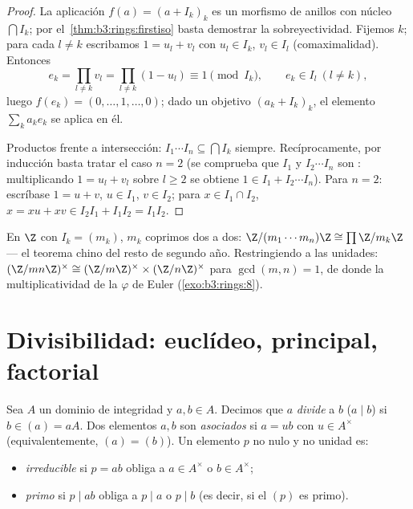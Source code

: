 \begin{proof}
La aplicación $f(a) = (a + I_k)_k$ es un morfismo de anillos con núcleo
$\bigcap I_k$; por el~\cref{thm:b3:rings:firstiso} basta demostrar la
sobreyectividad. Fijemos $k$; para cada $l \neq k$ escribamos $1 = u_l +
v_l$ con $u_l \in I_k$, $v_l \in I_l$ (comaximalidad). Entonces
\[
e_k = \prod_{l \neq k} v_l = \prod_{l\neq k}(1 - u_l)
\equiv 1 \pmod{I_k},
\qquad e_k \in I_l \ (l \neq k),
\]
luego $f(e_k) = (0, \dots, 1, \dots, 0)$; dado un objetivo $(a_k +
I_k)_k$, el elemento $\sum_k a_k e_k$ se aplica en él.

Productos frente a intersección: $I_1\cdots I_n \subseteq \bigcap I_k$
siempre. Recíprocamente, por inducción basta tratar el caso $n = 2$ (se
comprueba que $I_1$ y $I_2\cdots I_n$ son
: multiplicando $1 = u_l + v_l$
sobre $l \geq 2$ se obtiene $1 \in I_1 + I_2\cdots
I_n$). Para $n = 2$: escríbase $1 = u + v$, $u \in I_1$, $v \in I_2$;
para $x \in I_1 \cap I_2$, $x = xu + xv \in I_2I_1 + I_1I_2 =
I_1I_2$.
\end{proof}

\begin{example}\label{ex:b3:rings:crtz}
En $\Z$ con $I_k = (m_k)$, $m_k$ coprimos dos a dos: $\Z/(m_1\cdots
m_n)\Z \cong \prod \Z/m_k\Z$ --- el teorema chino del resto de segundo
año. Restringiendo a las unidades: $(\Z/mn\Z)^\times \cong
(\Z/m\Z)^\times \times (\Z/n\Z)^\times$ para $\gcd(m,n)=1$, de donde la
multiplicatividad de la $\varphi$ de Euler
(\cref{exo:b3:rings:8}).
\end{example}

\section{Divisibilidad: euclídeo, principal, factorial}

\begin{definition}\label{def:b3:rings:divisibility}
Sea $A$ un dominio de integridad y $a, b \in A$. Decimos que $a$
\emph{divide} a $b$ ($a \mid b$) si $b \in (a) = aA$. Dos elementos $a,
b$ son \emph{asociados} si $a = ub$ con
$u \in A^\times$ (equivalentemente, $(a) = (b)$). Un elemento $p$ no
nulo y no unidad es:
\begin{itemize}
  \item \emph{irreducible} si $p = ab$
  obliga a $a \in A^\times$ o $b \in A^\times$; \item
  \emph{primo} si $p \mid ab$ obliga a $p
        \mid a$ o $p \mid b$ (es decir, si el
   $(p)$ es primo).
\end{itemize}
\end{definition}

